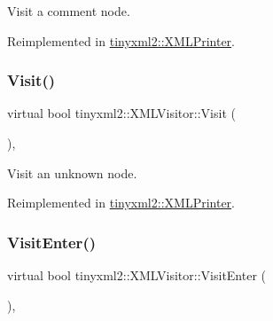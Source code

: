 Visit a comment node. 



Reimplemented in \mbox{\hyperlink{classtinyxml2_1_1_x_m_l_printer_aa294c5c01af0ebb9114902456e4cb53c}{tinyxml2\+::\+X\+M\+L\+Printer}}.

\mbox{\label{classtinyxml2_1_1_x_m_l_visitor_a14e4748387c34bf53d24e8119bb1f292}} 
\subsubsection{\texorpdfstring{Visit()}{Visit()}\hspace{0.1cm}{\footnotesize\ttfamily [4/4]}}
{\footnotesize\ttfamily virtual bool tinyxml2\+::\+X\+M\+L\+Visitor\+::\+Visit (\begin{DoxyParamCaption}\item[{const \mbox{\hyperlink{classtinyxml2_1_1_x_m_l_unknown}{X\+M\+L\+Unknown}} \&}]{ }\end{DoxyParamCaption})\hspace{0.3cm}{\ttfamily [inline]}, {\ttfamily [virtual]}}



Visit an unknown node. 



Reimplemented in \mbox{\hyperlink{classtinyxml2_1_1_x_m_l_printer_ab8af5455bbf9e4be2663e6642fcd7e32}{tinyxml2\+::\+X\+M\+L\+Printer}}.

\mbox{\label{classtinyxml2_1_1_x_m_l_visitor_acb3c22fc5f60eb9db98f533f2761f67d}} 
\subsubsection{\texorpdfstring{Visit\+Enter()}{VisitEnter()}\hspace{0.1cm}{\footnotesize\ttfamily [1/2]}}
{\footnotesize\ttfamily virtual bool tinyxml2\+::\+X\+M\+L\+Visitor\+::\+Visit\+Enter (\begin{DoxyParamCaption}\item[{const \mbox{\hyperlink{classtinyxml2_1_1_x_m_l_document}{X\+M\+L\+Document}} \&}]{ }\end{DoxyParamCaption})\hspace{0.3cm}{\ttfamily [inline]}, {\ttfamily [virtual]}}




